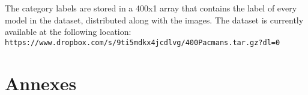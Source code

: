\documentclass[a4paper,11pt,pdf]{../templates/pacmanreport}
\begin{document}
The category labels are stored in a 400x1 array that contains the label of every model in the dataset, distributed along with the images. The dataset is currently available at the following location:  \\

{\tt \small https://www.dropbox.com/s/9ti5mdkx4jcdlvg/400Pacmans.tar.gz?dl=0} 




\newpage

\appendix
\section{Annexes}


\end{document}
